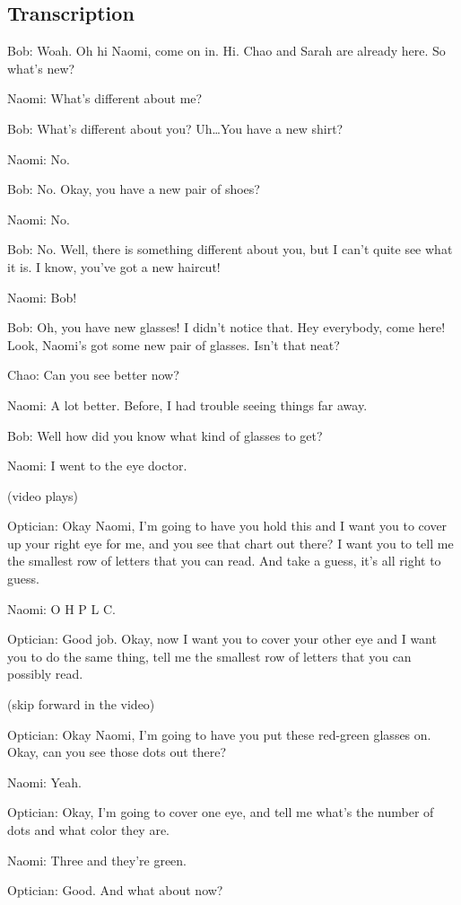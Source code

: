 \subsection{Transcription}

Bob: Woah. Oh hi Naomi, come on in. Hi. Chao and Sarah are already here. So what's new?

Naomi: What's different about me?

Bob: What's different about you? Uh\dots You have a new shirt?

Naomi: No.

Bob: No. Okay, you have a new pair of shoes?

Naomi: No.

Bob: No. Well, there is something different about you, but I can't quite see what it is. I know, you've got a new haircut!

Naomi: Bob!

Bob: Oh, you have new glasses! I didn't notice that. Hey everybody, come here! Look, Naomi's got some new pair of glasses. Isn't that neat?

Chao: Can you see better now?

Naomi: A lot better. Before, I had trouble seeing things far away.

Bob: Well how did you know what kind of glasses to get?

Naomi: I went to the eye doctor.

(video plays)

Optician: Okay Naomi, I'm going to have you hold this and I want you to cover up your right eye for me, and you see that chart out there? I want you to tell me the smallest row of letters that you can read. And take a guess, it's all right to guess.

Naomi: O H P L C.

Optician: Good job. Okay, now I want you to cover your other eye and I want you to do the same thing, tell me the smallest row of letters that you can possibly read.

(skip forward in the video)

Optician: Okay Naomi, I'm going to have you put these red-green glasses on. Okay, can you see those dots out there?

Naomi: Yeah.

Optician: Okay, I'm going to cover one eye, and tell me what's the number of dots and what color they are.

Naomi: Three and they're green.

Optician: Good. And what about now?

